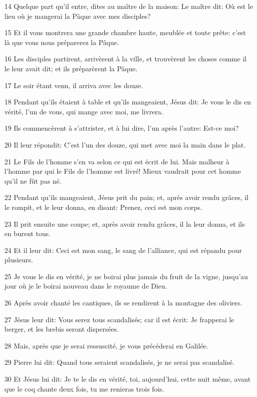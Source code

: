 \par 14 Quelque part qu'il entre, dites au maître de la maison: Le maître dit: Où est le lieu où je mangerai la Pâque avec mes disciples?
\par 15 Et il vous montrera une grande chambre haute, meublée et toute prête: c'est là que vous nous préparerez la Pâque.
\par 16 Les disciples partirent, arrivèrent à la ville, et trouvèrent les choses comme il le leur avait dit; et ils préparèrent la Pâque.
\par 17 Le soir étant venu, il arriva avec les douze.
\par 18 Pendant qu'ils étaient à table et qu'ils mangeaient, Jésus dit: Je vous le dis en vérité, l'un de vous, qui mange avec moi, me livrera.
\par 19 Ils commencèrent à s'attrister, et à lui dire, l'un après l'autre: Est-ce moi?
\par 20 Il leur répondit: C'est l'un des douze, qui met avec moi la main dans le plat.
\par 21 Le Fils de l'homme s'en va selon ce qui est écrit de lui. Mais malheur à l'homme par qui le Fils de l'homme est livré! Mieux vaudrait pour cet homme qu'il ne fût pas né.
\par 22 Pendant qu'ils mangeaient, Jésus prit du pain; et, après avoir rendu grâces, il le rompit, et le leur donna, en disant: Prenez, ceci est mon corps.
\par 23 Il prit ensuite une coupe; et, après avoir rendu grâces, il la leur donna, et ils en burent tous.
\par 24 Et il leur dit: Ceci est mon sang, le sang de l'alliance, qui est répandu pour plusieurs.
\par 25 Je vous le dis en vérité, je ne boirai plus jamais du fruit de la vigne, jusqu'au jour où je le boirai nouveau dans le royaume de Dieu.
\par 26 Après avoir chanté les cantiques, ils se rendirent à la montagne des oliviers.
\par 27 Jésus leur dit: Vous serez tous scandalisés; car il est écrit: Je frapperai le berger, et les brebis seront dispersées.
\par 28 Mais, après que je serai ressuscité, je vous précéderai en Galilée.
\par 29 Pierre lui dit: Quand tous seraient scandalisés, je ne serai pas scandalisé.
\par 30 Et Jésus lui dit: Je te le dis en vérité, toi, aujourd'hui, cette nuit même, avant que le coq chante deux fois, tu me renieras trois fois.
